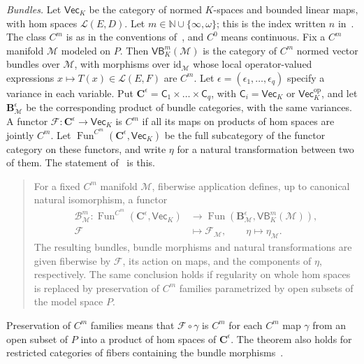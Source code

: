 \documentclass[11pt]{amsart}
\theoremstyle{definition}
\theoremstyle{remark}
\numberwithin{equation}{section}
\newcommand{\N}{\mathbb N}
\newcommand{\cL}{\mathcal L}
\newcommand{\id}{\mathrm{id}}
\theoremstyle{plain}
\theoremstyle{definition}
\theoremstyle{plain}
\begin{document}
\emph{Bundles.} Let $\mathsf{Vec}_K$ be the category of normed $K$-spaces and bounded linear maps, with hom spaces $\cL(E,D)$. Let $m\in\N\cup\{\infty,\omega\}$; this is the index written $n$ in~\cite{I}. The class $C^m$ is as in the conventions of~\cite[Section~1]{I}, and $C^0$ means continuous. Fix a $C^m$ manifold $\mathcal M$ modeled on $P$. Then $\mathsf{VB}^m_K(\mathcal M)$ is the category of $C^m$ normed vector bundles over $\mathcal M$, with morphisms over $\id_{\mathcal M}$ whose local operator-valued expressions $x\mapsto T(x)\in\cL(E,F)$ are $C^m$. Let $\epsilon=(\epsilon_1,\dots,\epsilon_q)$ specify a variance in each variable. Put $\mathbf C^\epsilon=\mathsf C_1\times\dots\times\mathsf C_q$, with $\mathsf C_i=\mathsf{Vec}_K$ or $\mathsf{Vec}_K^{\mathrm{op}}$, and let $\mathbf B^\epsilon_{\mathcal M}$ be the corresponding product of bundle categories, with the same variances. A functor $\mathcal F\colon\mathbf C^\epsilon\to\mathsf{Vec}_K$ is $C^m$ if all its maps on products of hom spaces are jointly $C^m$. Let $\operatorname{Fun}^{C^m}(\mathbf C^\epsilon,\mathsf{Vec}_K)$ be the full subcategory of the functor category on these functors, and write $\eta$ for a natural transformation between two of them. The statement of~\cite[Theorem~2.1]{I} is this.
\begin{quote}
For a fixed $C^m$ manifold $\mathcal M$, fiberwise application defines, up to canonical natural isomorphism, a functor
\[
\begin{aligned}
 \mathcal B^m_{\mathcal M}\colon
 \operatorname{Fun}^{C^m}(\mathbf C^\epsilon,\mathsf{Vec}_K)
 &\longrightarrow
 \operatorname{Fun}(\mathbf B^\epsilon_{\mathcal M},\mathsf{VB}^m_K(\mathcal M)),\\
 \mathcal F&\longmapsto\mathcal F_{\mathcal M},\qquad
 \eta\longmapsto\eta_{\mathcal M}.
\end{aligned}
\]
The resulting bundles, bundle morphisms and natural transformations are given fiberwise by $\mathcal F$, its action on maps, and the components of $\eta$, respectively. The same conclusion holds if regularity on whole hom spaces is replaced by preservation of $C^m$ families parametrized by open subsets of the model space $P$.
\end{quote}
Preservation of $C^m$ families means that $\mathcal F\circ\gamma$ is $C^m$ for each $C^m$ map $\gamma$ from an open subset of $P$ into a product of hom spaces of $\mathbf C^\epsilon$. The theorem also holds for restricted categories of fibers containing the bundle morphisms~\cite[text after Theorem~2.1]{I}.
\end{document}
